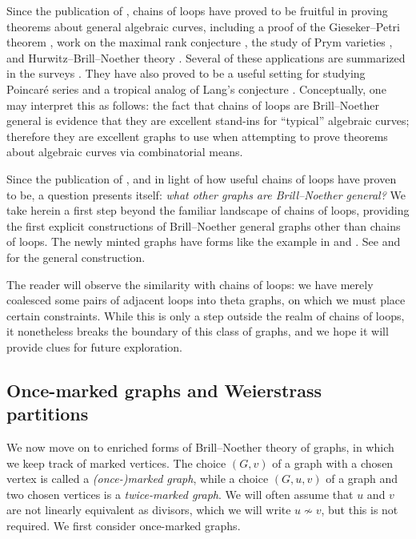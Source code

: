 Since the publication of \cite{CDPR12}, chains of loops have proved to be fruitful in proving theorems about general algebraic curves, including a proof of the Gieseker--Petri theorem \cite{JensenPayneTP1}, work on the maximal rank conjecture \cite{JensenPayneTP2}, the study of Prym varieties \cite{CLRW,LenUlirsch}, and Hurwitz--Brill--Noether theory \cite{PflKGonal, JensenRanganathan, CookPowellJensen}. Several of these applications are summarized in the surveys \cite{jensenNotices, jensen2021recent}. They have also proved to be a useful setting for studying Poincar\'e series and a tropical analog of Lang's conjecture \cite{manjunath2020poincar}. Conceptually, one may interpret this as follows: the fact that chains of loops are Brill--Noether general is evidence that they are excellent stand-ins for ``typical'' algebraic curves; therefore they are excellent graphs to use when attempting to prove theorems about algebraic curves via combinatorial means.

Since the publication of \cite{CDPR12}, and in light of how useful chains of loops have proven to be, a question presents itself: \emph{what other graphs are Brill--Noether general?} 
We take herein a first step beyond the familiar landscape of chains of loops, providing the first explicit constructions of Brill--Noether general graphs other than chains of loops. The newly minted graphs have forms like the example in  and . See  and  for the general construction.

The reader will observe the similarity with chains of loops: we have merely coalesced some pairs of adjacent loops into theta graphs, on which we must place certain constraints. While this is only a step outside the realm of chains of loops, it nonetheless breaks the boundary of this class of graphs, and we hope it will provide clues for future exploration.

\subsection{Once-marked graphs and Weierstrass partitions}


We now move on to enriched forms of Brill--Noether theory of graphs, in which we keep track of marked vertices.
The choice $(G,v)$ of a graph with a chosen vertex is called a \emph{(once-)marked graph}, while a choice $(G,u,v)$ of a graph and two chosen vertices is a \emph{twice-marked graph}. We will often assume that $u$ and $v$ are not linearly equivalent as divisors, which we will write $u \not\sim v$, but this is not required.  We first consider once-marked graphs.

